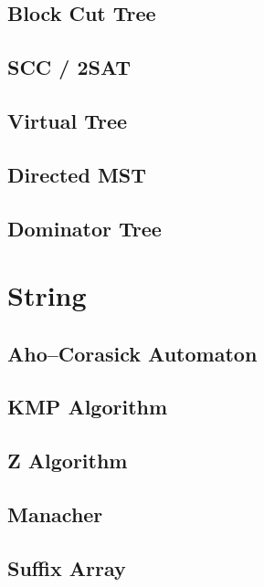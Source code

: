 \subsection{Block Cut Tree}

\subsection{SCC / 2SAT}

% 
\subsection{Virtual Tree}

\subsection{Directed MST}

\subsection{Dominator Tree}


\section{String}
\subsection{Aho–Corasick Automaton}

\subsection{KMP Algorithm}

\subsection{Z Algorithm}

\subsection{Manacher}

\subsection{Suffix Array}

